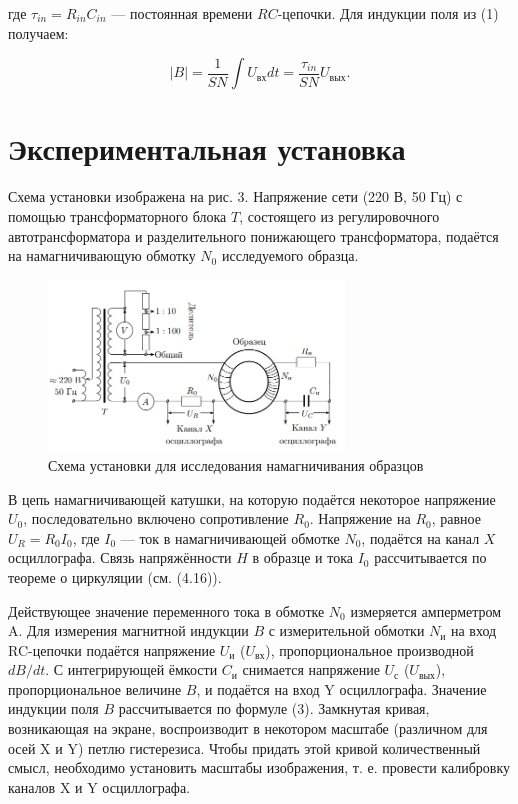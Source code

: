 \documentclass[12pt,a4paper]{article}
\begin{document}
где $\tau_{in} = R_{in} C_{in}$ — постоянная времени $RC$-цепочки. Для индукции поля из (1) получаем:

\[
|B| = \frac{1}{SN} \int U_{\text{вх}} dt = \frac{\tau_{in}}{SN} U_{\text{вых}}.
\]

\section{Экспериментальная установка}



Схема установки изображена на рис. 3. Напряжение сети (220 В, 50 Гц) с помощью трансформаторного блока $T$, состоящего из регулировочного автотрансформатора и разделительного понижающего трансформатора, подаётся на намагничивающую обмотку $N_0$ исследуемого образца.

\begin{figure}[h!]
    \centering
    \includegraphics[width=0.7\textwidth]{magnetizing_circuit.png}
    \caption{Схема установки для исследования намагничивания образцов}
\end{figure}

В цепь намагничивающей катушки, на которую подаётся некоторое напряжение $U_0$, последовательно включено сопротивление $R_0$. Напряжение на $R_0$, равное $U_R = R_0 I_0$, где $I_0$ — ток в намагничивающей обмотке $N_0$, подаётся на канал $X$ осциллографа. Связь напряжённости $H$ в образце и тока $I_0$ рассчитывается по теореме о циркуляции (см. (4.16)).

Действующее значение переменного тока в обмотке $N_0$ измеряется амперметром A.
Для измерения магнитной индукции $B$ с измерительной обмотки $N_\text{и}$
на вход RC-цепочки подаётся напряжение $U_\text{и}$ ($U_\text{вх}$), пропорциональное
производной $dB/dt$. С интегрирующей ёмкости $C_\text{и}$ снимается напряжение $U_\text{с}$ ($U_\text{вых}$), пропорциональное величине $B$, и подаётся на вход Y
осциллографа. Значение индукции поля $B$ рассчитывается по формуле (3).
Замкнутая кривая, возникающая на экране, воспроизводит в некотором масштабе (различном для осей X и Y) петлю гистерезиса. Чтобы придать этой кривой количественный смысл, необходимо установить
масштабы изображения, т. е. провести калибровку каналов X и Y осциллографа.
\end{document}
